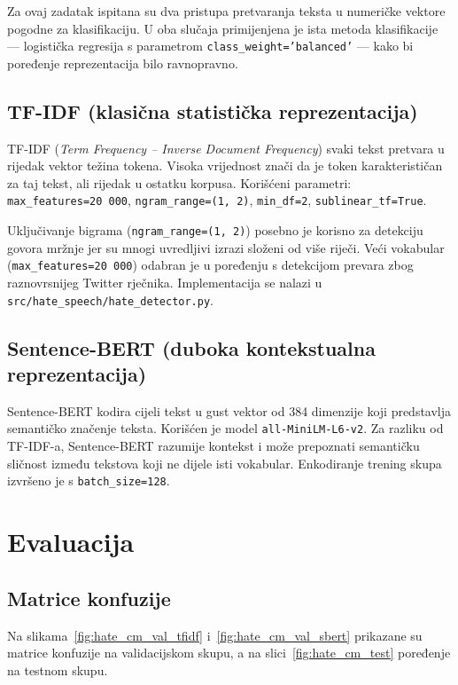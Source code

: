 Za ovaj zadatak ispitana su dva pristupa pretvaranja teksta u numeričke vektore pogodne za klasifikaciju. U oba slučaja primijenjena je ista metoda klasifikacije --- logistička regresija s parametrom \texttt{class\_weight='balanced'} --- kako bi poređenje reprezentacija bilo ravnopravno.

\subsection{TF-IDF (klasična statistička reprezentacija)}

TF-IDF (\textit{Term Frequency -- Inverse Document Frequency}) svaki tekst pretvara u rijedak vektor težina tokena. Visoka vrijednost znači da je token karakterističan za taj tekst, ali rijedak u ostatku korpusa. Korišćeni parametri: \texttt{max\_features=20\,000}, \texttt{ngram\_range=(1,\,2)}, \texttt{min\_df=2}, \texttt{sublinear\_tf=True}.

Uključivanje bigrama (\texttt{ngram\_range=(1,\,2)}) posebno je korisno za detekciju govora mržnje jer su mnogi uvredljivi izrazi složeni od više riječi. Veći vokabular (\texttt{max\_features=20\,000}) odabran je u poređenju s detekcijom prevara zbog raznovrsnijeg Twitter rječnika. Implementacija se nalazi u \texttt{src/hate\_speech/hate\_detector.py}.

\subsection{Sentence-BERT (duboka kontekstualna reprezentacija)}

Sentence-BERT kodira cijeli tekst u gust vektor od 384 dimenzije koji predstavlja semantičko značenje teksta. Korišćen je model \texttt{all-MiniLM-L6-v2}. Za razliku od TF-IDF-a, Sentence-BERT razumije kontekst i može prepoznati semantičku sličnost između tekstova koji ne dijele isti vokabular. Enkodiranje trening skupa izvršeno je s \texttt{batch\_size=128}.

\section{Evaluacija}

\subsection{Matrice konfuzije}

Na slikama~\ref{fig:hate_cm_val_tfidf} i~\ref{fig:hate_cm_val_sbert} prikazane su matrice konfuzije na validacijskom skupu, a na slici~\ref{fig:hate_cm_test} poređenje na testnom skupu.

